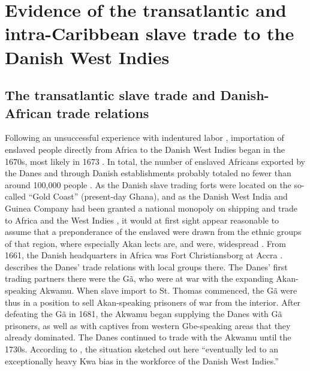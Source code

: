 \documentclass[output=paper,colorlinks,citecolor=brown]{langscibook}
\begin{document}
\section{Evidence of the transatlantic and intra-Caribbean slave trade to the Danish West Indies}

\subsection{The transatlantic slave trade and Danish-African trade relations}

Following an unsuccessful experience with indentured labor \citep{Hvid_2016}, importation of enslaved people directly from Africa to the Danish West Indies began in the 1670s, most likely in 1673 \citep[40]{Westergaard_1917}. In total, the number of enslaved Africans exported by the Danes and through Danish establishments probably totaled no fewer than around 100,000 people \citep[15]{Gobel_2016}. As the Danish slave trading forts were located on the so-called “Gold Coast” (present-day Ghana), and as the Danish West India and Guinea Company had been granted a national monopoly on shipping and trade to Africa and the West Indies \citep[12]{Gobel_2016}, it would at first sight appear reasonable to assume that a preponderance of the enslaved were drawn from the ethnic groups of that region, where especially Akan lects are, and were, widespread \citep{Hair_1967,Hair_1968}. From 1661, the Danish headquarters in Africa was Fort Christiansborg at Accra \citep{Norregaard_1966}. \citet[66]{Sabino_2012} describes the Danes’ trade relations with local groups there. The Danes’ first trading partners there were the G\~a, who were at war with the expanding Akan-speaking Akwamu. When slave import to St. Thomas commenced, the G\~a were thus in a position to sell Akan-speaking prisoners of war from the interior. After defeating the G\~a in 1681, the Akwamu began supplying the Danes with G\~a prisoners, as well as with captives from western Gbe-speaking areas that they already dominated. The Danes continued to trade with the Akwamu until the 1730s. According to \citet[135]{Parkvall_2000}, the situation sketched out here ``eventually led to an exceptionally heavy Kwa bias in the workforce of the Danish West Indies.''
\end{document}

